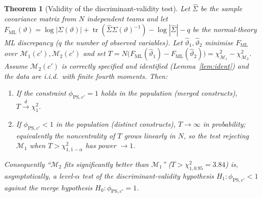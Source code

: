 \documentclass{amsart}
\newtheorem{theorem}{Theorem}
\theoremstyle{remark}
\begin{document}
\begin{theorem}[Validity of the discriminant-validity test]\label{thm:diff}
Let $\hat\Sigma$ be the sample covariance matrix from $N$ independent teams and let
$F_{\mathrm{ML}}(\vartheta)=\log|\Sigma(\vartheta)|+\operatorname{tr}(\hat\Sigma\Sigma(\vartheta)^{-1})
-\log|\hat\Sigma|-q$ be the normal-theory ML discrepancy ($q$ the number of observed
variables). Let $\hat\vartheta_1,\hat\vartheta_2$ minimise $F_{\mathrm{ML}}$ over
$\mathcal M_1(c'),\mathcal M_2(c')$ and set
$T=N\big(F_{\mathrm{ML}}(\hat\vartheta_1)-F_{\mathrm{ML}}(\hat\vartheta_2)\big)
=\chi^2_{\mathcal M_1}-\chi^2_{\mathcal M_2}$.
Assume $\mathcal M_2(c')$ is correctly specified and identified
(Lemma~\ref{lem:ident}) and the data are i.i.d.\ with finite fourth moments. Then:
\begin{enumerate}
\item[(i)] If the constraint $\phi_{\mathrm{PS},c'}=1$ holds in the population
(merged constructs), $T\xrightarrow{d}\chi^2_1$.
\item[(ii)] If $\phi_{\mathrm{PS},c'}<1$ in the population (distinct constructs),
$T\to\infty$ in probability; equivalently the noncentrality of $T$ grows linearly
in $N$, so the test rejecting $\mathcal M_1$ when $T>\chi^2_{1,1-\alpha}$ has power
$\to1$.
\end{enumerate}
Consequently ``$\mathcal M_2$ fits significantly better than $\mathcal M_1$''
($T>\chi^2_{1,0.95}=3.84$) is, asymptotically, a level-$\alpha$ test of the
discriminant-validity hypothesis $H_1:\phi_{\mathrm{PS},c'}<1$ against the
merge hypothesis $H_0:\phi_{\mathrm{PS},c'}=1$.
\end{theorem}
\end{document}
